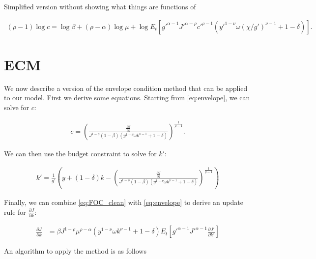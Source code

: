 \documentclass[10pt]{article}
\newcommand{\fracpd}[2]{
  \ensuremath{\frac{\partial #1}{\partial #2}}
}
\newcommand{\pfrac}[2]{
  \ensuremath{ \left( \frac{#1}{#2} \right)}
}
\begin{document}
Simplified version without showing what things are functions of

\begin{align*}
  (\rho - 1)\log c =\log \beta + (\rho-  \alpha) \log \mu + \log E_t \left[ g'^{\alpha-1} J'^{\alpha - \rho} c'^{\rho - 1} (y'^{1 - \nu} \omega (\chi/g')^{\nu - 1} + 1 - \delta)  \right].
\end{align*}

\section{ECM}

We now describe a version of the envelope condition method that can be applied
to our model. First we derive some equations. Starting from \eqref{eq:envelope}, we
can solve for $c$:

\begin{align} \label{eq:c_from_env}
  c = \pfrac{\fracpd{J}{k}}{J^{1-\rho}(1 - \beta) (y^{1-\nu} \omega k^{\nu-1} + 1 - \delta)}^{\frac{1}{\rho-1}}.
\end{align}

We can then use the budget constraint to solve for $k'$:

\begin{align}
  \label{eq:k_from_bc}
  k' = \frac{1}{g'} \left( y + (1 - \delta)k -  \pfrac{\fracpd{J}{k}}{J^{1-\rho}(1 - \beta) (y^{1-\nu} \omega k^{\nu-1} + 1 - \delta)}^{\frac{1}{\rho-1}} \right)
\end{align}


Finally, we can combine \eqref{eq:FOC_clean} with \eqref{eq:envelope} to derive
an update rule for $\fracpd{J}{k}$:

\begin{align}
  \label{eq:j_k_update}
  \fracpd{J}{k} &= \beta J^{1-\rho} \mu^{\rho - \alpha} (y^{1-\nu} \omega k^{\nu-1} + 1 - \delta) E_t \left[ g'^{\alpha - 1}J'^{\alpha - 1} \fracpd{J'}{k'} \right]
\end{align}

An algorithm to apply the method is as follows
\end{document}
